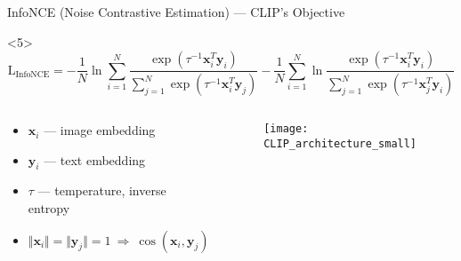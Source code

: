 \documentclass[utf8,aspectratio=169,ngerman,english,usenames,dvipsnames]{beamer}
\begin{document}
\begin{frame}{InfoNCE (Noise Contrastive Estimation) --- CLIP's Objective}
    \begin{onlyenv}<5>
        \begin{equation*}
            \operatorname{L_{InfoNCE}} =
            - \frac{1}{N} \ln \sum_{i=1}^{N} \frac{\exp(\tau^{-1} \mathbf{x}_i^T \mathbf{y}_i)}{\sum_{j=1}^{N} \exp(\tau^{-1} \mathbf{x}_i^T \mathbf{y}_j)}
            - \frac{1}{N} \sum_{i=1}^{N} \ln \frac{\exp(\tau^{-1} \mathbf{x}_i^T \mathbf{y}_i)}{\sum_{j=1}^{N} \exp(\tau^{-1} \mathbf{x}_j^T \mathbf{y}_i)}
        \end{equation*}
        \begin{columns}
            \begin{column}{0.5\textwidth}
                \begin{itemize}
                    \item $\mathbf{x}_i$ --- image embedding
                    \item $\mathbf{y}_i$ --- text embedding
                    \item $\tau$ --- temperature, inverse entropy
                    \item $\Vert \mathbf{x}_i \Vert = \Vert \mathbf{y}_j \Vert = 1 \ \Rightarrow \ \cos(\mathbf{x}_i, \mathbf{y}_j) = \mathbf{x}_i^T \mathbf{y}_j$
                \end{itemize}
            \end{column}
            \begin{column}{0.5\textwidth}
                \begin{figure}
                    \centering
                    \texttt{[image: CLIP\_architecture\_small]}
                \end{figure}
            \end{column}
        \end{columns}
    \end{onlyenv}
\end{frame}
\end{document}
